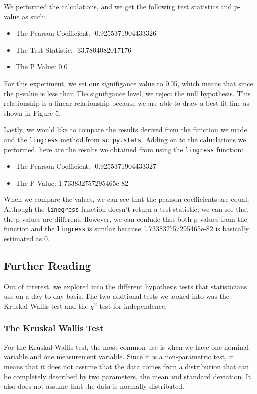 \documentclass[a4paper, twocolumn]{article}
\begin{document}
We performed the calculations, and we get the following test statistics and p-value as such:
\begin{itemize}
    \item The Pearson Coefficient:  -0.9255371904433326
    \item The Test Statistic:  -33.7804082017176  
    \item The P Value:  0.0
\end{itemize}

For this experiment, we set our signifigance value to 0.05, which means that since the p-value is less than The
signifigance level, we reject the null hypothesis. This relationship is a linear relationship because we
are able to draw a best fit line as shown in Figure 5. 

Lastly, we would like to compare the results derived from the function we made and the \texttt{lingress} method from
\texttt{scipy.stats}. Adding on to the caluclations we performed, here are the results we obtained from using the 
\texttt{lingress} function:

\begin{itemize}
    \item The Pearson Coefficient:  -0.9255371904433327  
    \item The P Value:  1.733832757295465e-82
\end{itemize}

When we compare the values, we can see that the pearson coefficients are equal. Although the \texttt{linegress}
function doesn't return a test statistic, we can see that the p-values are different. However, we can conlude that
both p-values from the function and the \texttt{lingress} is similar because 1.733832757295465e-82 is basically 
estimated as 0.

\subsection{Further Reading}
Out of interest, we explored into the different hypothesis tests that statisticians use on a day to day basis. The 
two addtional tests we looked into was the Kruskal-Wallis test and the $\chi^2$ test for independence. 

\subsubsection{The Kruskal Wallis Test}
For the Kruskal Wallis test, the most common use is when we have one nominal variable and one measurement variable.
Since it is a non-parametric test, it means that it does not assume that the data comes from a distribution that can
be completely described by two parameters, the mean and standard deviation. It also does not assume that the data 
is normally distributed. 
\end{document}

